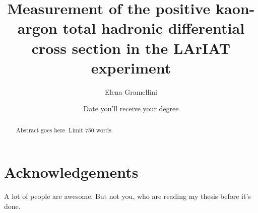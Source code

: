 \documentclass[letterpaper,12pt,draft]{yalephd}
\newenvironment{dedication}
  {%
   \thispagestyle{empty}%
   \vspace*{\stretch{1}}%
   \itshape             %
   \raggedleft          %
  }
  {\par %
   \vspace{\stretch{3}} %
   \clearpage           %
  }
\begin{document}
  

\title{Measurement of the positive kaon-argon total hadronic differential cross section in the LArIAT experiment}
\author{Elena Gramellini}
\date{Date you'll receive your degree} %

\frontmatter

\begin{abstract}
Abstract goes here. Limit 750 words.
\end{abstract}


\maketitle
{}

\tableofcontents
\listoffigures %
\listoftables %

\chapter{Acknowledgements} %
A lot of people are awesome. But not you, who are reading my thesis before it's done.

\mainmatter












\end{document}
